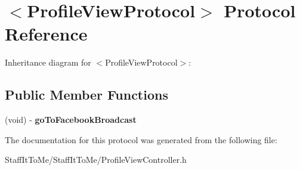 \hypertarget{protocol_profile_view_protocol-p}{
\section{$<$\-Profile\-View\-Protocol$>$ \-Protocol \-Reference}
\label{protocol_profile_view_protocol-p}
}


\-Inheritance diagram for $<$\-Profile\-View\-Protocol$>$\-:
\subsection*{\-Public \-Member \-Functions}
\begin{DoxyCompactItemize}
\item 
\hypertarget{protocol_profile_view_protocol-p_adbd989de1bbde944985300abcc1652ea}{
(void) -\/ {\bfseries go\-To\-Facebook\-Broadcast}}
\label{protocol_profile_view_protocol-p_adbd989de1bbde944985300abcc1652ea}

\end{DoxyCompactItemize}


\-The documentation for this protocol was generated from the following file\-:\begin{DoxyCompactItemize}
\item 
\-Staff\-It\-To\-Me/\-Staff\-It\-To\-Me/\-Profile\-View\-Controller.\-h\end{DoxyCompactItemize}
